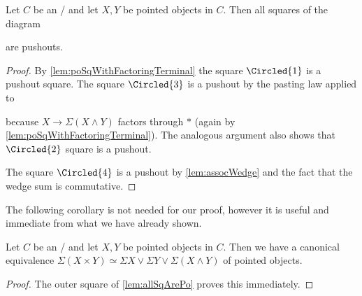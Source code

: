 \begin{lemma}\label{lem:allSqArePo}
    Let $C$ be an \inftytop/ and let $X,Y$ be pointed objects in $C$. 
    Then all squares of the diagram         
    \begin{center}
    \end{center}
    are pushouts.
    \begin{proof}
        By \cref{lem:poSqWithFactoringTerminal} the square $\Circled{1}$ is a pushout square.
        The square $\Circled{3}$ is a pushout by the pasting law applied to
        \begin{center}
        \end{center}
        because $X\to\Sigma\left(X\wedge Y\right)$ factors through $*$ (again by \cref{lem:poSqWithFactoringTerminal}).
        The analogous argument also shows that $\Circled{2}$ square is a pushout.

        The square $\Circled{4}$ is a pushout by \cref{lem:assocWedge} and the fact that the wedge sum is commutative.
    \end{proof}
\end{lemma}
The following corollary is not needed for our proof, however it is useful and immediate from what we have already shown.
\begin{corollary}
    Let $C$ be an \inftytop/ and let $X,Y$ be pointed objects in $C$. 
    Then we have a canonical equivalence $\Sigma\left(X\times Y\right)\simeq\Sigma X\vee\Sigma Y\vee\Sigma\left(X\wedge Y\right)$ of pointed objects.
    \begin{proof}
        The outer square of \cref{lem:allSqArePo} proves this immediately. 
    \end{proof}
\end{corollary}
